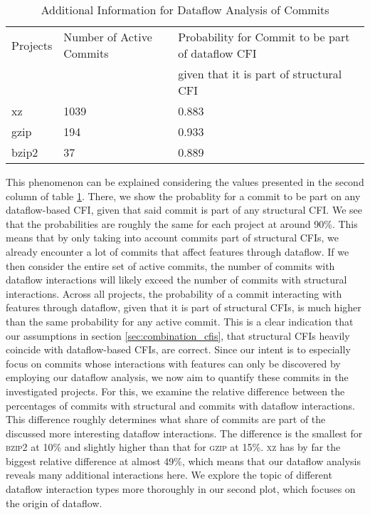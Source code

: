\begin{table}[t]
\caption{Additional Information for Dataflow Analysis of Commits}
\label{tab:commit_dfbr_table}
\begin{tabular}{lll}
 Projects & Number of Active Commits & Probability for Commit to be part of dataflow CFI \\
 	  & 			     & given that it is part of structural CFI \\
xz & 1039 & 0.883 \\
gzip & 194 & 0.933 \\
bzip2 & 37 & 0.889 \\
\end{tabular}
\end{table}

This phenomenon can be explained considering the values presented in the second column of table \ref{tab:commit_dfbr_table}.
There, we show the probablity for a commit to be part on any dataflow-based CFI, given that said commit is part of any structural CFI.
We see that the probabilities are roughly the same for each project at around 90\%.
This means that by only taking into account commits part of structural CFIs, we already encounter a lot of commits that affect features through dataflow.
If we then consider the entire set of active commits, the number of commits with dataflow interactions will likely exceed the number of commits with structural interactions.
Across all projects, the probability of a commit interacting with features through dataflow, given that it is part of structural CFIs, is much higher than the same probability for any active commit.
This is a clear indication that our assumptions in section \ref{sec:combination_cfis}, that structural CFIs heavily coincide with dataflow-based CFIs, are correct.
Since our intent is to especially focus on commits whose interactions with features can only be discovered by employing our dataflow analysis, we now aim to quantify these commits in the investigated projects.
For this, we examine the relative difference between the percentages of commits with structural and commits with dataflow interactions.
This difference roughly determines what share of commits are part of the discussed more interesting dataflow interactions.
The difference is the smallest for \textsc{bzip2} at 10\% and slightly higher than that for \textsc{gzip} at 15\%.
\textsc{xz} has by far the biggest relative difference at almost 49\%, which means that our dataflow analysis reveals many additional interactions here.
We explore the topic of different dataflow interaction types more thoroughly in our second plot, which focuses on the \textsf{origin} of dataflow. \\
